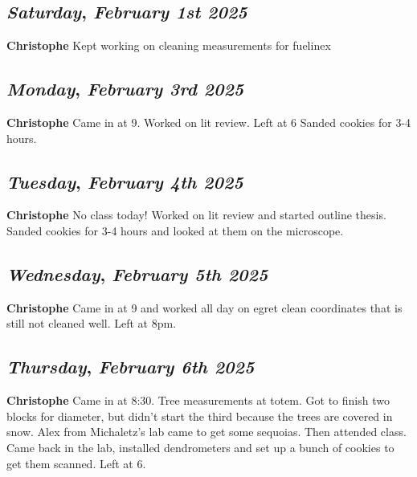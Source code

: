 \begin{center}
\section*{\month}
\end{center}

\def\day{\textit{February 1st 2025}}
\def\weekday{\textit{Saturday}}
\subsection*{\weekday, \day}
\textbf {Christophe}
Kept working on cleaning measurements for fuelinex

\def\day{\textit{February 3rd 2025}}
\def\weekday{\textit{Monday}}
\subsection*{\weekday, \day}
\textbf {Christophe}
Came in at 9. Worked on lit review. Left at 6
Sanded cookies for 3-4 hours.
\def\day{\textit{February 4th 2025}}
\def\weekday{\textit{Tuesday}}
\subsection*{\weekday, \day}
\textbf {Christophe}
No class today! Worked on lit review and started outline thesis.
Sanded cookies for 3-4 hours and looked at them on the microscope.

\def\day{\textit{February 5th 2025}}
\def\weekday{\textit{Wednesday}}
\subsection*{\weekday, \day}
\textbf {Christophe}
Came in at 9 and worked all day on egret clean coordinates that is still not cleaned well. Left at 8pm.

\def\day{\textit{February 6th 2025}}
\def\weekday{\textit{Thursday}}
\subsection*{\weekday, \day}
\textbf {Christophe}
Came in at 8:30. Tree measurements at totem. Got to finish two blocks for diameter, but didn't start the third because the trees are covered in snow. Alex from Michaletz's lab came to get some sequoias. Then attended class. Came back in the lab, installed dendrometers and set up a bunch of cookies to get them scanned. Left at 6.

\def\day{\textit{February 7th 2025}}
\def\weekday{\textit{Friday}}
